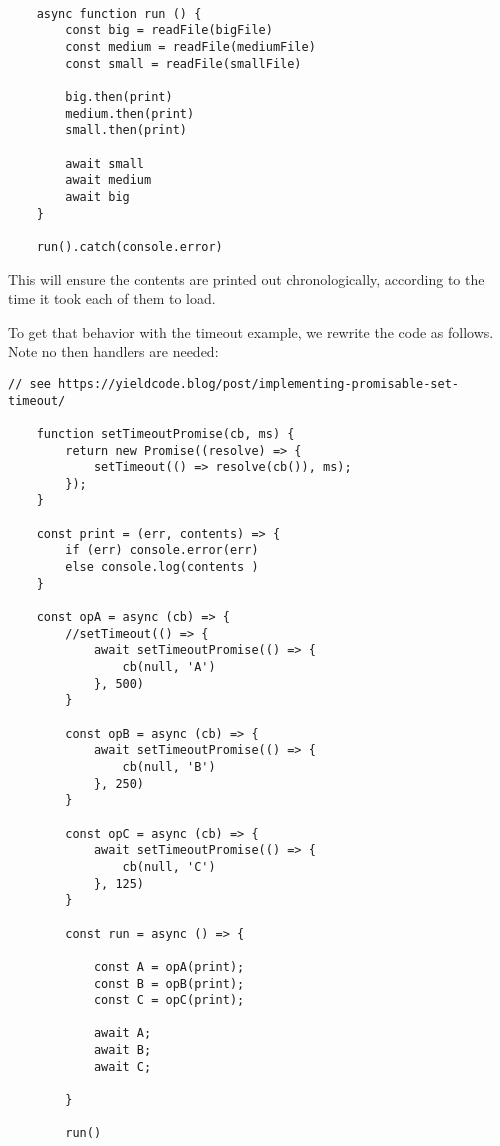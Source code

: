 \documentclass{scrartcl}
\begin{document}
\begin{lstlisting}[style=ES6]

    async function run () {
        const big = readFile(bigFile)
        const medium = readFile(mediumFile)
        const small = readFile(smallFile)

        big.then(print)
        medium.then(print)
        small.then(print)

        await small
        await medium
        await big
    }

    run().catch(console.error)

\end{lstlisting}

This will ensure the contents are printed out chronologically, according to the time it took each of them to load.

To get that behavior with the timeout example, we rewrite the code as follows. Note no then handlers are needed:

\begin{lstlisting}[style=ES6]
    // see https://yieldcode.blog/post/implementing-promisable-set-timeout/

    function setTimeoutPromise(cb, ms) {
        return new Promise((resolve) => {
            setTimeout(() => resolve(cb()), ms);
        });
    }

    const print = (err, contents) => {
        if (err) console.error(err)
        else console.log(contents )
    }

    const opA = async (cb) => {
        //setTimeout(() => {
            await setTimeoutPromise(() => {
                cb(null, 'A')
            }, 500)
        }

        const opB = async (cb) => {
            await setTimeoutPromise(() => {
                cb(null, 'B')
            }, 250)
        }

        const opC = async (cb) => {
            await setTimeoutPromise(() => {
                cb(null, 'C')
            }, 125)
        }

        const run = async () => {

            const A = opA(print);
            const B = opB(print);
            const C = opC(print);

            await A;
            await B;
            await C;

        }

        run()

\end{lstlisting}
\end{document}
